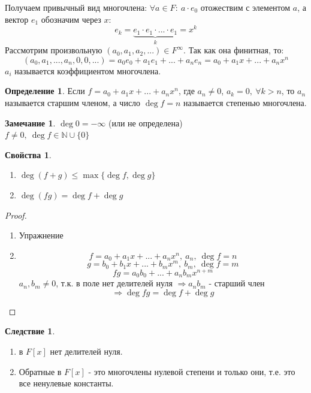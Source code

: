\documentclass[a4paper, 12pt]{article}
\newcommand{\N}{\mathbb N}
\newcommand\tab[1][.5cm]{\hspace*{#1}}
\theoremstyle{definition}
\newtheorem*{definition}{Определение}
\newtheorem*{consequense}{Следствие}
\newtheorem*{remark}{Замечание}
\newtheorem*{properties}{Свойства}
\begin{document}
  Получаем привычный вид многочлена: 
  $\forall a \in F: \ a\cdot e_0$ отожествим с элементом $a$, а вектор $e_1$ обозначим через $x$:
  $$e_k = \underbrace{e_1 \cdot e_1 \cdot ... \cdot e_1}_{k}  = x^k$$     
  Рассмотрим произвольную $(a_0,a_1, a_2,...) \in F^{\infty}$. Так как она финитная, то: 
  $$(a_0,a_1, ..., a_n,0, 0,...) = a_0e_0 + a_1e_1+...+a_ne_n = a_0 + a_1x+...+a_nx^n$$
  $a_i$ называется коэффициентом многочлена.
  \begin{definition}
    Если $f = a_0 + a_1x+...+a_nx^n$, где $a_n \neq 0$, $a_k = 0,  \ \forall k>n$, то $a_n$ называется старшим членом, а число $\deg f = n$  называется степенью многочлена.  
  \end{definition} 
  \begin{remark}
    $\deg 0 = -\infty$ (или не определена)\\
    $f\neq 0, \ \deg f \in \N \cup \{0\}$  
  \end{remark} 
  \begin{properties}\tab
    \begin{enumerate}
      \item $\deg (f+g) \leq \max \{\deg f, \deg g\}$
      \item $\deg (fg) = \deg f + \deg g$  
    \end{enumerate}
  \end{properties}
  \begin{proof} \tab
    \begin{enumerate}
      \item Упражнение
      \item $$f = a_0 + a_1x+...+a_nx^n, \ a_n, \ \deg f = n$$
      $$g = b_0 + b_1x+...+b_mx^m, \ b_m, \ \deg f = m$$
      $$fg = a_0b_0 +...+a_nb_mx^{n+m}$$
      $a_n, b_m \neq 0$, т.к. в поле нет делителей нуля 
      $\Longrightarrow a_nb_m$ - старший член $$\Longrightarrow \deg fg = \deg f + \deg g$$     
    \end{enumerate}
  \end{proof}
  \begin{consequense}\tab
    \begin{enumerate}
      \item в $F[x]$ нет делителей нуля.
      \item Обратные в $F[x]$ - это многочлены нулевой степени и только они, т.е. это все ненулевые константы. 
    \end{enumerate}
  \end{consequense} 
\end{document}
